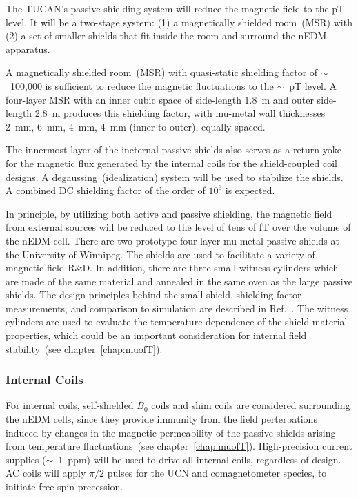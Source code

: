 The TUCAN's passive shielding system will reduce the magnetic field to
the pT level. It will be a two-stage system: (1) a magnetically
shielded room~(MSR) with (2) a set of smaller shields that fit inside
the room and surround the nEDM apparatus.

A magnetically shielded room~(MSR) with quasi-static
shielding factor of $\sim$~100,000 is sufficient to reduce the magnetic
fluctuations to the $\sim$~pT level. A four-layer MSR with an inner
cubic space of side-length 1.8~m and outer side-length 2.8~m produces
this shielding factor, with mu-metal wall thicknesses 2~mm, 6~mm,
4~mm, 4~mm (inner to outer), equally spaced.


The innermost layer of the ineternal passive shields also serves as a
return yoke for the magnetic flux generated by the internal coils for
the shield-coupled coil designs. A degaussing~(idealization) system
will be used to stabilize the shields. A combined DC shielding factor
of the order of $10^6$ is expected.


In principle, by utilizing both active and passive shielding, the
magnetic field from external sources will be reduced to the level of
tens of fT over the volume of the nEDM cell.  There are two prototype
four-layer mu-metal passive shields at the University of Winnipeg. The
shields are used to facilitate a variety of magnetic field R\&D. In
addition, there are three small witness cylinders which are made of
the same material and annealed in the same oven as the large passive
shields. The design principles behind the small shield, shielding
factor measurements, and comparison to simulation are described in
Ref.~\cite{martin2015large}.  The witness cylinders are used to
evaluate the temperature dependence of the shield material properties,
which could be an important consideration for internal field
stability~(see chapter~\ref{chap:muofT}).


\subsubsection{Internal Coils}
For internal coils, self-shielded $B_0$ coils and shim coils are
considered surrounding the nEDM cells, since they provide immunity
from the field perterbations induced by changes in the magnetic
permeability of the passive shields arising from temperature
fluctuations~(see chapter~\ref{chap:muofT}).  High-precision current
supplies ($\sim$~1~ppm) will be used to drive all internal coils,
regardless of design. AC coils will apply $\pi/2$ pulses for the UCN
and comagnetometer species, to initiate free spin precession.

